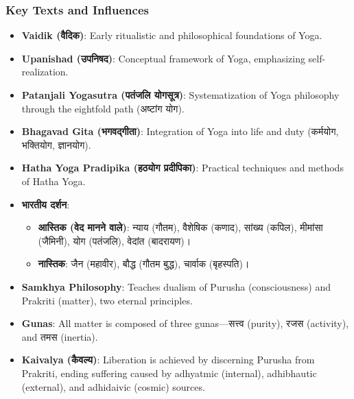 \begin{frame}[fragile]\frametitle{Key Texts and Influences}

  \begin{itemize}
	\item \textbf{Vaidik (वैदिक)}: Early ritualistic and philosophical foundations of Yoga.
	\item \textbf{Upanishad (उपनिषद)}: Conceptual framework of Yoga, emphasizing self-realization.
	\item \textbf{Patanjali Yogasutra (पतंजलि योगसूत्र)}: Systematization of Yoga philosophy through the eightfold path (अष्टांग योग).
	\item \textbf{Bhagavad Gita (भगवद्गीता)}: Integration of Yoga into life and duty (कर्मयोग, भक्तियोग, ज्ञानयोग).
	\item \textbf{Hatha Yoga Pradipika (हठयोग प्रदीपिका)}: Practical techniques and methods of Hatha Yoga.
	\item \textbf{भारतीय दर्शन}:
		\begin{itemize}
			\item \textbf{आस्तिक (वेद मानने वाले)}: न्याय (गौतम), वैशेषिक (कणाद), सांख्य (कपिल), मीमांसा (जैमिनी), योग (पतंजलि), वेदांत (बादरायण)।
			\item \textbf{नास्तिक}: जैन (महावीर), बौद्ध (गौतम बुद्ध), चार्वाक (बृहस्पति)।
	    \end{itemize}
	\item \textbf{Samkhya Philosophy}: Teaches dualism of Purusha (consciousness) and Prakriti (matter), two eternal principles.
	\item \textbf{Gunas}: All matter is composed of three gunas—सत्त्व (purity), रजस (activity), and तमस (inertia).
	\item \textbf{Kaivalya (कैवल्य)}: Liberation is achieved by discerning Purusha from Prakriti, ending suffering caused by adhyatmic (internal), adhibhautic (external), and adhidaivic (cosmic) sources.
  \end{itemize}

\end{frame}


